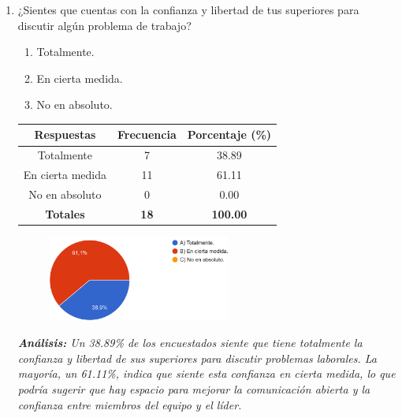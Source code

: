 \documentclass[journal]{IEEEtran}
\begin{document}
\begin{enumerate}
	\item ¿Sientes que cuentas con la confianza y libertad de tus superiores para discutir algún problema de trabajo?
	\begin{enumerate}
		\item Totalmente.
		\item En cierta medida.
		\item No en absoluto.
	\end{enumerate}
	\begin{table}[H]
		\renewcommand{\arraystretch}{1.3}
		\centering
		\begin{tabular}{|c|c|c|}
			\hline
			\textbf{Respuestas} & \textbf{Frecuencia} & \textbf{Porcentaje (\%)}\\
			\hline
			Totalmente & 7 & 38.89\\
			En cierta medida & 11 & 61.11\\
			No en absoluto & 0 & 0.00\\
			\hline
			\textbf{Totales} &\textbf{18}& \textbf{100.00}\\
			\hline
		\end{tabular}
	\end{table}
	\begin{figure}[h]
		\centering
		\includegraphics[width=06cm]{Pregunta16}
	\end{figure}
	\textit{\textbf{Análisis:} Un 38.89\% de los encuestados siente que tiene totalmente la confianza y libertad de sus superiores para discutir problemas laborales. La mayoría, un 61.11\%, indica que siente esta confianza en cierta medida, lo que podría sugerir que hay espacio para mejorar la comunicación abierta y la confianza entre miembros del equipo y el líder.}\\
	

\end{enumerate}
\end{document}
